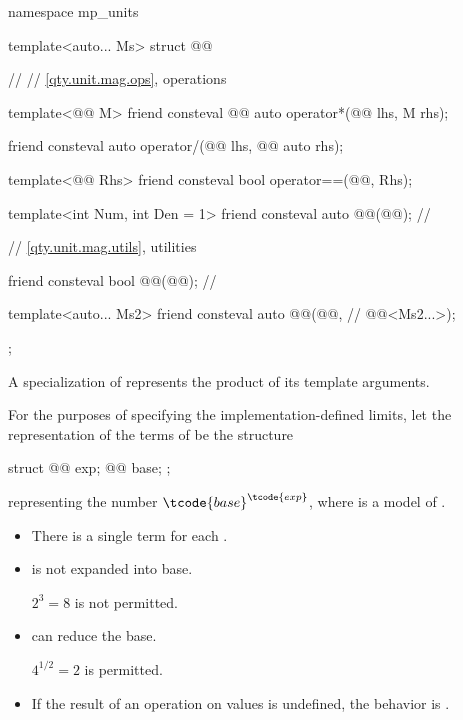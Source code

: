 \begin{codeblock}
namespace mp_units {

template<auto... Ms>
struct @@ {  // \expos
  // \ref{qty.unit.mag.ops}, operations

  template<@@ M>
  friend consteval @@ auto operator*(@@ lhs, M rhs);

  friend consteval auto operator/(@@ lhs, @@ auto rhs);

  template<@@ Rhs>
  friend consteval bool operator==(@@, Rhs);

  template<int Num, int Den = 1>
  friend consteval auto @@(@@);                         // \expos

  // \ref{qty.unit.mag.utils}, utilities

  friend consteval bool @@(@@);  // \expos

  template<auto... Ms2>
  friend consteval auto @@(@@,             // \expos
                                         @@<Ms2...>);
};

}
\end{codeblock}

\pnum
A specialization of 
represents the product of its template arguments.

\pnum
For the purposes of specifying the implementation-defined limits,
let the representation of the terms of  be the structure
\begin{codeblock}
struct {
  @@ exp;
  @@ base;
};
\end{codeblock}
representing the number $\tcode{base}^\tcode{exp}$,
where  is a model of .
\begin{itemize}
\item
There is a single term for each .
\item
{} is not expanded into base.
\begin{note}
$2^3 = 8$ is not permitted.
\end{note}
\item
{} can reduce the base.
\begin{note}
$4^{1/2} = 2$ is permitted.
\end{note}
\item
If the result of an operation on  values is undefined,
the behavior is
.
\end{itemize}

